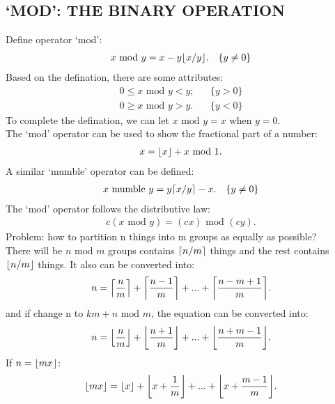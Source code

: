 \documentclass{article}
\DeclarePairedDelimiter\ceil{\lceil}{\rceil}
\DeclarePairedDelimiter\floor{\lfloor}{\rfloor}
\begin{document}
\subsection{`MOD': THE BINARY OPERATION}
Define operator `mod':
\begin{align}
x \text{ mod } y = x - y \floor{x / y}. && \{y \neq 0\}
\end{align}
Based on the defination, there are some attributes:
\begin{align}
0 \le x \text{ mod } y < y; && \{ y > 0\} \\
0 \ge x \text{ mod } y > y. && \{ y < 0\}
\end{align}
To complete the defination, we can let $x \text{ mod } y = x$ when $y = 0$.\\
The `mod' operator can be used to show the fractional part of a number:
\begin{align}
x = \floor{x} + x \text{ mod } 1.
\end{align}
A similar `mumble' operator can be defined:
\begin{align}
x \text{ mumble } y = y \ceil{x / y} - x. && \{y \neq 0\}
\end{align}
The `mod' operator follows the distributive law:
\begin{align}
c(x \text{ mod } y) = (cx) \text{ mod } (cy).
\end{align}
Problem: how to partition n things into m groups as equally as possible?\\
There will be $n \text{ mod } m$ groups contains $\ceil{n/m}$ things and the rest contains $\floor{n/m}$ things.
It also can be converted into:
\begin{align}
n = \ceil*{\frac{n}{m}} + \ceil*{\frac{n-1}{m}} +  ... + \ceil*{\frac{n - m + 1}{m}}.
\end{align}
and if change n to $km + n \text{ mod } m$, the equation can be converted into:
\begin{align}
n = \floor*{\frac{n}{m}} + \floor*{\frac{n+1}{m}} +  ... + \floor*{\frac{n + m - 1}{m}}.
\end{align}
If $n = \floor{mx}$:
\begin{align}
\floor{mx} = \floor*{x} + \floor*{x + \frac{1}{m}} +  ... + \floor*{x + \frac{m - 1}{m}}.
\end{align}
\end{document}

